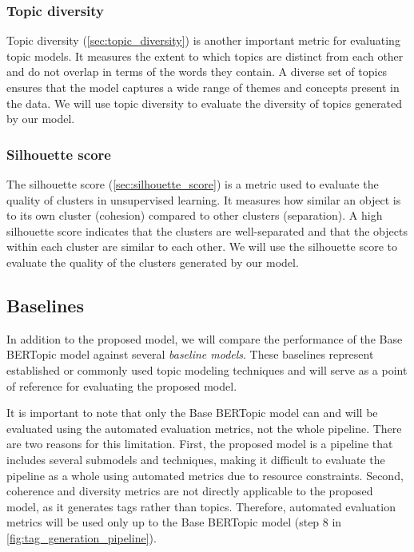 \subsubsection{Topic diversity}
Topic diversity (\cref{sec:topic_diversity}) is another important metric for evaluating topic models. It measures the extent to which topics are distinct from each other and do not overlap in terms of the words they contain. A diverse set of topics ensures that the model captures a wide range of themes and concepts present in the data. We will use topic diversity to evaluate the diversity of topics generated by our model.

\subsubsection{Silhouette score}
The silhouette score (\cref{sec:silhouette_score}) is a metric used to evaluate the quality of clusters in unsupervised learning. It measures how similar an object is to its own cluster (cohesion) compared to other clusters (separation). A high silhouette score indicates that the clusters are well-separated and that the objects within each cluster are similar to each other. We will use the silhouette score to evaluate the quality of the clusters generated by our model.

\subsection{Baselines}
In addition to the proposed model, we will compare the performance of the Base BERTopic model against several \textit{baseline models}. These baselines represent established or commonly used topic modeling techniques and will serve as a point of reference for evaluating the proposed model. 

It is important to note that only the Base BERTopic model can and will be evaluated using the automated evaluation metrics, not the whole pipeline. There are two reasons for this limitation. First, the proposed model is a pipeline that includes several submodels and techniques, making it difficult to evaluate the pipeline as a whole using automated metrics due to resource constraints. Second, coherence and diversity metrics are not directly applicable to the proposed model, as it generates tags rather than topics. Therefore, automated evaluation metrics will be used only up to the Base BERTopic model (step 8 in \cref{fig:tag_generation_pipeline}).

